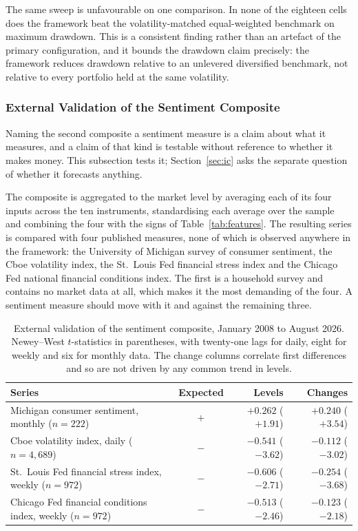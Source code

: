 \documentclass{singlecol-new}
\theoremstyle{TH}{
\newtheorem{lemma}{Lemma}
\newtheorem{theorem}[lemma]{Theorem}
\newtheorem{corrolary}[lemma]{Corrolary}
\newtheorem{conjecture}[lemma]{Conjecture}
\newtheorem{proposition}[lemma]{Proposition}
\newtheorem{claim}[lemma]{Claim}
\newtheorem{stheorem}[lemma]{Wrong Theorem}
\newtheorem{algorithm}{Algorithm}
}
\theoremstyle{THrm}{
\newtheorem{definition}{Definition}[section]
\newtheorem{question}{Question}[section]
\newtheorem{remark}{Remark}
\newtheorem{scheme}{Scheme}
}
\theoremstyle{THhit}{
\newtheorem{case}{Case}[section]
}
\begin{document}
The same sweep is unfavourable on one comparison. In none of the eighteen cells does the
framework beat the volatility-matched equal-weighted benchmark on maximum drawdown. This
is a consistent finding rather than an artefact of the primary configuration, and it
bounds the drawdown claim precisely: the framework reduces drawdown relative to an
unlevered diversified benchmark, not relative to every portfolio held at the same
volatility.

\subsubsection{External Validation of the Sentiment Composite}
\label{sec:sentval}

Naming the second composite a sentiment measure is a claim about what it measures, and a
claim of that kind is testable without reference to whether it makes money. This
subsection tests it; Section~\ref{sec:ic} asks the separate question of whether it
forecasts anything.

The composite is aggregated to the market level by averaging each of its four inputs
across the ten instruments, standardising each average over the sample and combining the
four with the signs of Table~\ref{tab:features}. The resulting series is compared with
four published measures, none of which is observed anywhere in the framework: the
University of Michigan survey of consumer sentiment, the Cboe volatility index, the
St.~Louis Fed financial stress index and the Chicago Fed national financial conditions
index. The first is a household survey and contains no market data at all, which makes it
the most demanding of the four. A sentiment measure should move with it and against the
remaining three.

\begin{table}[!ht]
\centering
\caption{External validation of the sentiment composite, January 2008 to August 2026.
Newey--West $t$-statistics in parentheses, with twenty-one lags for daily, eight for
weekly and six for monthly data. The change columns correlate first differences and so
are not driven by any common trend in levels.}
\label{tab:sentval}
\footnotesize
\begin{tabular}{p{4.5cm}crr}
\hline
\textbf{Series} & \textbf{Expected} & \textbf{Levels} & \textbf{Changes} \\
\hline
Michigan consumer sentiment, monthly ($n=222$) & $+$ & $+0.262$ ($+1.91$) & $+0.240$ ($+3.54$) \\
\hline
Cboe volatility index, daily ($n=4{,}689$) & $-$ & $-0.541$ ($-3.62$) & $-0.112$ ($-3.02$) \\
\hline
St.~Louis Fed financial stress index, weekly ($n=972$) & $-$ & $-0.606$ ($-2.71$) & $-0.254$ ($-3.68$) \\
\hline
Chicago Fed financial conditions index, weekly ($n=972$) & $-$ & $-0.513$ ($-2.46$) & $-0.123$ ($-2.18$) \\
\hline
\end{tabular}
\end{table}
\end{document}

